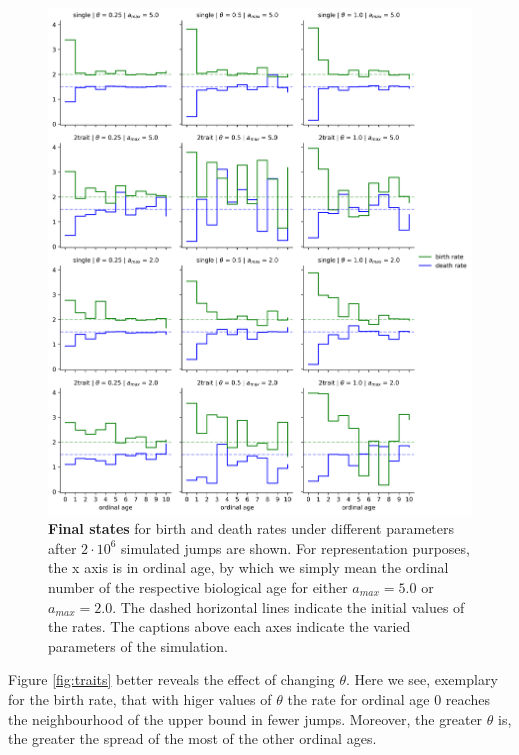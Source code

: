 \documentclass[11pt, a4paper]{article}
\theoremstyle{definition}
\begin{document}
    \begin{figure}[!htb]
        \includegraphics[width=\textwidth]{figures/step-mage_5_2.png}
        \caption{\textbf{Final states} for birth and death rates under different parameters after $2\cdot 10^6$ simulated jumps are shown. For representation purposes, the x axis is in ordinal age, by which we simply mean the ordinal number of the respective biological age for either $a_{max}=5.0$ or $a_{max}=2.0$. The dashed horizontal lines indicate the initial values of the rates. The captions above each axes indicate the varied parameters of the simulation.}
        \label{fig:step}
    \end{figure}

    Figure \ref{fig:traits} better reveals the effect of changing $\theta$. Here we see, exemplary for the birth rate, that with higer values of $\theta$ the rate for ordinal age $0$ reaches the neighbourhood of the upper bound in fewer jumps. Moreover, the greater $\theta$ is, the greater the spread of the most of the other ordinal ages.
\end{document}
